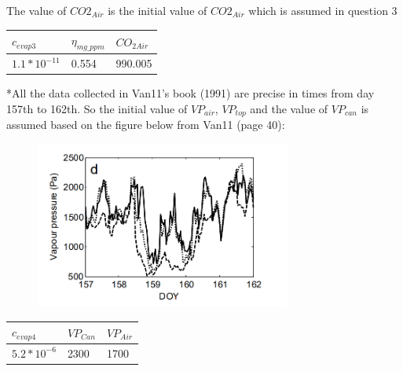 \documentclass[a4paper]{article}
\numberwithin{equation}{section}
\begin{document}
The value of $CO2_{Air}$ is the initial value of $CO2_{Air}$ which is assumed in question 3

\begin{table}[H]
\centering
\begin{tabular}{|l|l|l|}
\hline
\rowcolor[HTML]{FFFC9E} 
\textbf{$c_{evap3}$} & \textbf{$\eta_{mg\_ppm}$} & \cellcolor[HTML]{FFFC9E}\textbf{$CO_{2Air}$}\\ \hline
$1.1*10^{-11}$            &  0.554              &  990.005                 \\ \hline
\end{tabular}
\end{table}

*All the data collected in Van11's book (1991) are precise in times from day 157th to 162th. So the initial value of $VP_{air}$, $VP_{top}$ and the value of $VP_{can}$ is assumed based on the figure below from Van11 (page 40):
\begin{figure}[H]
    \centering
    \includegraphics[width=0.75\textwidth]{VP.png}
\end{figure}

\begin{table}[H]
\centering
\begin{tabular}{|l|l|l|}
\hline
\rowcolor[HTML]{FFFC9E} 
\textbf{$c_{evap4}$} & \textbf{$VP_{Can}$} & \cellcolor[HTML]{FFFC9E}\textbf{$VP_{Air}$}\\ \hline
$5.2*10^{-6}$             &  2300              &  1700               \\ \hline
\end{tabular}
\end{table}
\end{document}
